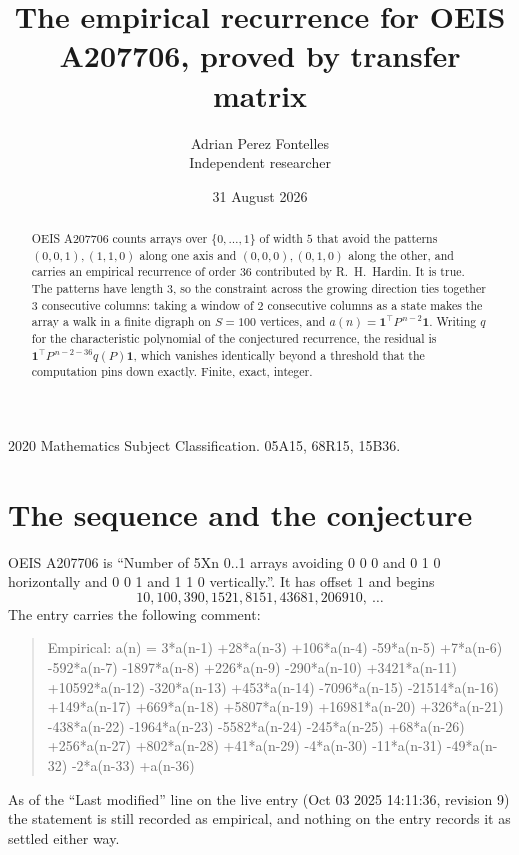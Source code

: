 \documentclass[11pt,a4paper]{article}
\title{The empirical recurrence for OEIS A207706, proved by transfer matrix}
\author{Adrian Perez Fontelles\\ \small Independent researcher}
\date{31 August 2026}
\theoremstyle{plain}
\theoremstyle{definition}
\begin{document}
\maketitle

\begin{abstract}
OEIS A207706 counts arrays over $\{0,\dots,1\}$ of width $5$ that avoid the patterns
$(0,0,1), (1,1,0)$ along one axis and $(0,0,0), (0,1,0)$ along the other, and carries an empirical recurrence of
order $36$ contributed by R.~H.~Hardin. It is true. The patterns have length $3$, so
the constraint across the growing direction ties together $3$ consecutive columns: taking a
window of $2$ consecutive columns as a state makes the array a walk in a finite digraph
on $S=100$ vertices, and $a(n)=\mathbf{1}^{\!\top}P^{\,n-2}\mathbf{1}$. Writing $q$
for the characteristic polynomial of the conjectured recurrence, the residual is
$\mathbf{1}^{\!\top}P^{\,n-2-36}q(P)\mathbf{1}$, which vanishes identically
beyond a threshold that the computation pins down exactly. Finite, exact, integer.
\end{abstract}

\noindent\small 2020 Mathematics Subject Classification. 05A15, 68R15, 15B36.\normalsize

\section{The sequence and the conjecture}

OEIS A207706 is ``Number of 5Xn 0..1 arrays avoiding 0 0 0 and 0 1 0 horizontally and 0 0 1 and 1 1 0 vertically.''. It has offset
$1$ and begins
\[
10, 100, 390, 1521, 8151, 43681, 206910,\ \dots
\]
The entry carries the following comment:
\begin{quote}\small
Empirical: a(n) = 3*a(n-1) +28*a(n-3) +106*a(n-4) -59*a(n-5) +7*a(n-6) -592*a(n-7) -1897*a(n-8) +226*a(n-9) -290*a(n-10) +3421*a(n-11) +10592*a(n-12) -320*a(n-13) +453*a(n-14) -7096*a(n-15) -21514*a(n-16) +149*a(n-17) +669*a(n-18) +5807*a(n-19) +16981*a(n-20) +326*a(n-21) -438*a(n-22) -1964*a(n-23) -5582*a(n-24) -245*a(n-25) +68*a(n-26) +256*a(n-27) +802*a(n-28) +41*a(n-29) -4*a(n-30) -11*a(n-31) -49*a(n-32) -2*a(n-33) +a(n-36)
\end{quote}
As of the ``Last modified'' line on the live entry (Oct 03 2025 14:11:36, revision
9) the statement is still recorded as empirical, and nothing on the entry
records it as settled either way.
\end{document}
